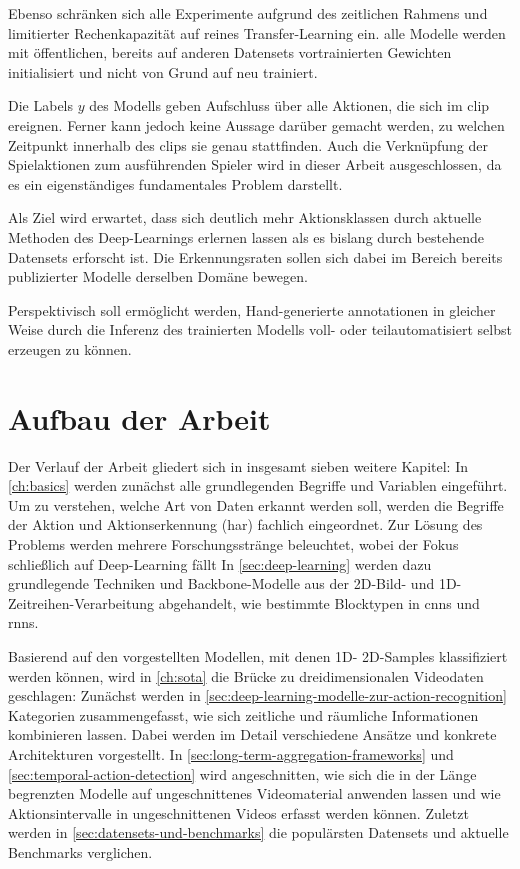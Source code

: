 Ebenso schränken sich alle Experimente aufgrund des zeitlichen Rahmens und limitierter Rechenkapazität auf reines Transfer-Learning ein.
\Dh alle Modelle werden mit öffentlichen, bereits auf anderen Datensets vortrainierten Gewichten initialisiert und nicht von Grund auf neu trainiert.

Die Labels $y$ des Modells geben Aufschluss über alle Aktionen, die sich im \gls{clip} ereignen.
Ferner kann jedoch keine Aussage darüber gemacht werden, zu welchen Zeitpunkt innerhalb des \glspl{clip} sie genau stattfinden.
Auch die Verknüpfung der Spielaktionen zum ausführenden Spieler wird in dieser Arbeit ausgeschlossen, da es ein eigenständiges fundamentales Problem darstellt.

Als Ziel wird erwartet, dass sich deutlich mehr Aktionsklassen durch aktuelle Methoden des Deep-Learnings erlernen lassen als es bislang durch bestehende Datensets erforscht ist.
Die Erkennungsraten sollen sich dabei im Bereich bereits publizierter Modelle derselben Domäne bewegen.

Perspektivisch soll ermöglicht werden, Hand-generierte \gls{annotationen} in gleicher Weise durch die Inferenz des trainierten Modells voll- oder teilautomatisiert selbst erzeugen zu können.

\section{Aufbau der Arbeit}
\label{sec:aufbau-der-arbeit}

Der Verlauf der Arbeit gliedert sich in insgesamt sieben weitere Kapitel:
In \autoref{ch:basics} werden zunächst alle grundlegenden Begriffe und Variablen eingeführt.
Um zu verstehen, welche Art von Daten erkannt werden soll, werden die Begriffe der Aktion und Aktionserkennung (\gls{har}) fachlich eingeordnet.
Zur Lösung des Problems werden mehrere Forschungsstränge beleuchtet, wobei der Fokus schließlich auf Deep-Learning fällt
In \autoref{sec:deep-learning} werden dazu grundlegende Techniken und Backbone-Modelle aus der 2D-Bild- und 1D-Zeitreihen-Verarbeitung abgehandelt, wie bestimmte Blocktypen in \glspl{cnn} und \glspl{rnn}.

Basierend auf den vorgestellten Modellen, mit denen 1D- \bzw 2D-Samples klassifiziert werden können, wird in \autoref{ch:sota} die Brücke zu dreidimensionalen Videodaten geschlagen:
Zunächst werden in \autoref{sec:deep-learning-modelle-zur-action-recognition} Kategorien zusammengefasst, wie sich zeitliche und räumliche Informationen kombinieren lassen.
Dabei werden im Detail verschiedene Ansätze und konkrete Architekturen vorgestellt.
In \autoref{sec:long-term-aggregation-frameworks} und \autoref{sec:temporal-action-detection} wird angeschnitten, wie sich die in der Länge begrenzten Modelle auf ungeschnittenes Videomaterial anwenden lassen und wie Aktionsintervalle in ungeschnittenen Videos erfasst werden können.
Zuletzt werden in \autoref{sec:datensets-und-benchmarks} die populärsten Datensets und aktuelle Benchmarks verglichen.

